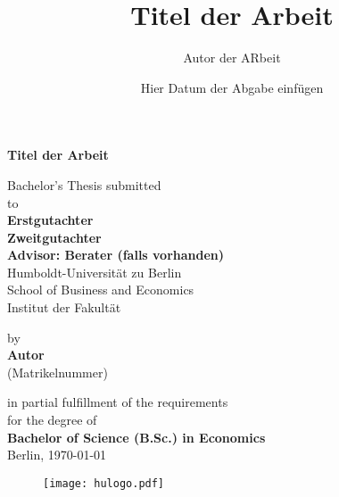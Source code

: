 \documentclass[12pt]{article}
\title{Titel der Arbeit}
\author{Autor der ARbeit}
\date{Hier Datum der Abgabe einfügen}
\begin{document}
		
		\begin{titlepage}
		\pagestyle{empty}
		\begin{center}

		    {\Large{\bf Titel der Arbeit}} \vspace{0.5cm}


		    {\normalsize Bachelor's Thesis submitted\\\vspace{0.5cm}
		    to}\\\vspace{0.5cm}
		    {\normalsize{\bf
			   	 Erstgutachter \\
		 	     Zweitgutachter \\\vspace{0.5cm}
	 		     Advisor: Berater (falls vorhanden)}}\\\vspace{0.5cm}
		    {\normalsize Humboldt-Universit\"at zu Berlin \\
		    School of Business and Economics \\
		    Institut der Fakultät} \vspace{1cm}


		    {\normalsize by \\\vspace{0.5cm}
		    {\bf Autor} \\
		    (Matrikelnummer)} \vspace{1cm}


		    {\normalsize in partial fulfillment of the requirements \\
		    for the degree of \\
		    {\bf Bachelor of Science (B.Sc.) in Economics} \\ 
		    Berlin, \today} %
		    
		    \begin{figure}[!b]
		    \centering
		    \begin{minipage}{0.45\textwidth}
		        \centering
		        \texttt{[image: hulogo.pdf]} %
		    \end{minipage}\hfill
		\end{figure}

\end{center}
\end{titlepage}
\end{document}
